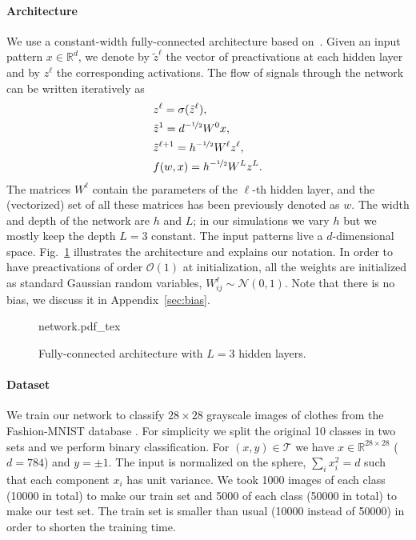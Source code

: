 \documentclass{article}
\renewcommand{\cite}[1]{\citep{#1}}
\newcommand{\aref}[1]{Appendix~\ref{#1}}
\newcommand{\fref}[1]{Fig.~\ref{#1}}
\begin{document}
\paragraph{Architecture}
We use a constant-width fully-connected architecture based on~\cite{jacot2018neural}.
Given an input pattern $x \in \mathbb{R}^d$, we denote by $\tilde z^\ell$ the vector of preactivations at each hidden layer and by $z^\ell$ the corresponding activations. The flow of signals through the network can be written iteratively as
\begin{align}
&z^\ell = \sigma(\tilde z^\ell),\\
&\tilde z^{1} = d^{-\nicefrac12} W^0 x,\\
&\tilde z^{\ell+1} = h^{-\nicefrac12} W^\ell z^\ell,\\
&f(w, x) = h^{-\nicefrac12} W^L z^L.
\end{align}
The matrices $W^\ell$ contain the parameters of the $\ell$-th hidden layer, and the (vectorized) set of all these matrices has been previously denoted as $w$.
The width and depth of the network are $h$ and $L$; in our simulations we vary $h$ but we mostly keep the depth $L=3$ constant. The input patterns live a $d$-dimensional space. \fref{fig:network} illustrates the architecture and explains our notation. 
In order to have preactivations of order $\mathcal{O}(1)$ at initialization, all the weights are initialized as standard Gaussian random variables, $W^\ell_{ij} \sim \mathcal{N}(0,1)$.
Note that there is no bias, we discuss it in \aref{sec:bias}.

\begin{figure}[ht]
    \centering
    {network.pdf_tex}
    \caption{Fully-connected architecture with $L=3$ hidden layers.
    \label{fig:network}}
\end{figure}

\paragraph{Dataset}
We train our network to classify $28\times28$ grayscale images of clothes from the Fashion-MNIST database \cite{xiao2017/online}.
For simplicity we split the original 10 classes in two sets and we perform binary classification.
For $(x, y) \in \mathcal{T}$ we have $x \in \mathbb R^{28\times28}$ ($d=784$) and $y = \pm 1$. The input is normalized on the sphere, $\sum_i x_i^2 = d$ such that each component $x_i$ has unit variance.
We took 1000 images of each class (10000 in total) to make our train set and 5000 of each class (50000 in total) to make our test set.
The train set is smaller than usual (10000 instead of 50000) in order to shorten the training time.
\end{document}

